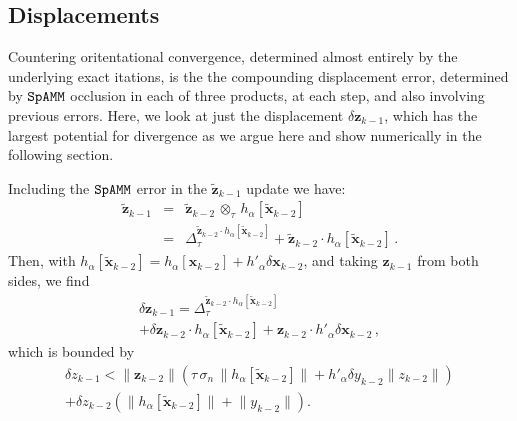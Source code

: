\documentclass[letterpaper,twocolumn,amsmath,amsfont,amssymb,english,aps,jcp,preprintnumbers,groupaddress,nofootinbib,tightenlines,floatfix]{revtex4}
\newcommand{\mat}[1]{\boldsymbol{#1}}
\newcommand{\ot}{  {\scriptstyle \otimes}_{ \tau } }
\theoremstyle{plain}
\theoremstyle{remark}
\theoremstyle{plain}
\begin{document}
\subsection{Displacements}
Countering oritentational convergence,  determined almost entirely by the underlying exact itations, is the 
the compounding displacement error, determined by $\tt SpAMM$ occlusion in each of three products, at each step, and also
involving previous errors.  Here, we look at just the displacement $\delta \mat{z}_{k-1}$,
which has the largest potential for divergence as we argue here and show numerically in the following section. 

Including the $\tt SpAMM$ error in the $\widetilde{\mat{z}}_{k-1}$ update we have:
\begin{eqnarray} \label{widetildez}
 \widetilde{\mat{z}}_{k-1} &=&  \widetilde{\mat{z}}_{k-2}  \, \ot \, h_\alpha[\widetilde{\mat{x}}_{k-2}]\\ \nonumber
&=& \Delta^{\widetilde{\mat{z}}_{k-2} \cdot h_\alpha \left[ \widetilde{\mat{x}}_{k-2}\right]}_\tau
+ \widetilde{\mat{z}}_{k-2} \cdot h_\alpha\left[ \widetilde{\mat{x}}_{k-2}\right] \, .
\end{eqnarray}
Then, with $ h_\alpha \left[ \widetilde{\mat{x}}_{k-2} \right]
=  h_\alpha \left[ \mat{x}_{k-2} \right] +  h'_\alpha  \delta \mat{x}_{k-2}$, and taking $\mat{z}_{k-1}$ from both sides, we find  
\begin{multline}
 \delta {\mat{z}}_{k-1} =\Delta^{\widetilde{\mat{z}}_{k-2} \cdot h_\alpha \left[ \widetilde{\mat{x}}_{k-2}\right]}_\tau
\\ +\delta \mat{z}_{k-2} \cdot h_\alpha \left[\widetilde{\mat{x}}_{k-2} \right]
+ \mat{z}_{k-2} \cdot h'_\alpha \delta \mat{x}_{k-2}  \, ,
\end{multline}
which is bounded by 
 \begin{multline}\label{zdispalcementbound}
  \delta {z}_{k-1} <
 \lVert \mat{z}_{k-2} \rVert \left( \tau  \, \sigma_n  \, \lVert h_\alpha \left[\widetilde{\mat{x}}_{k-2} \right]  \rVert
 + h'_\alpha  \delta y_{k-2} \lVert z_{k-2} \rVert \right)  \\ 
 + \delta {z}_{k-2} \left( \lVert h_\alpha \left[\widetilde{\mat{x}}_{k-2}  \right] \rVert  + \lVert y_{k-2} \rVert \right) .
 \end{multline}
\end{document}
